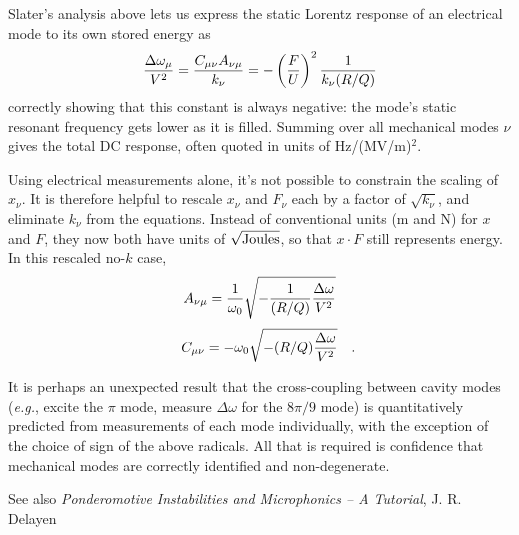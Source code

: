 Slater's analysis above lets us express the static Lorentz response of an
electrical mode to its own stored energy as
$${\Delta \omega_\mu\over V^2} = {C_{\mu\nu} A_{\nu\mu}\over k_\nu} = - \left({F\over U}\right)^2 {1 \over k_\nu (R/Q)}$$
correctly showing that this constant is always negative:
the mode's static resonant frequency gets lower as it is filled.
Summing over all mechanical modes $\nu$ gives the total DC response,
often quoted in units of \hbox{Hz/(MV/m)$^2$}.

Using electrical measurements alone,
it's not possible to constrain the scaling of $x_\nu$.
It is therefore helpful to
rescale $x_\nu$ and $F_\nu$ each by a factor of $\sqrt{k_\nu}$,
and eliminate $k_\nu$ from the equations.  Instead of conventional
units (m and N) for $x$ and $F$, they now both have units
of $\sqrt{\rm Joules}$, so that $x\cdot F$ still represents energy.
In this rescaled no-$k$ case,
$$A_{\nu\mu} = {1\over \omega_0} \sqrt{-{1\over (R/Q)} {\Delta \omega \over V^2}} $$
$$C_{\mu\nu} = -\omega_0 \sqrt{-(R/Q){\Delta \omega \over V^2}}\rlap{~~~.}$$

It is perhaps an unexpected result that the cross-coupling between
cavity modes ({\it e.g.}, excite the $\pi$ mode, measure $\Delta\omega$
for the $8\pi/9$ mode) is quantitatively predicted from measurements of
each mode individually, with the exception of the choice of sign of
the above radicals.  All that is required is confidence that mechanical
modes are correctly identified and non-degenerate.

See also
{\it Ponderomotive Instabilities and Microphonics -- A Tutorial}, J. R. Delayen

\bye
